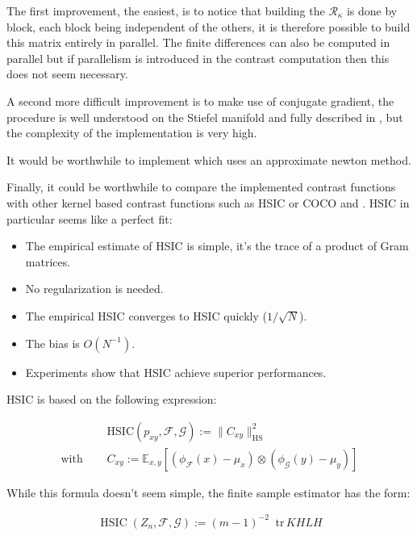 \documentclass[a4paper,BCOR=5mm,oneside,openany]{scrreprt}
\newcommand*\tr{\mathop{}\!\mathrm{tr}}
\begin{document}
The first improvement, the easiest, is to notice that building the $\mathcal{R}_\kappa$ is done by block, each block being independent of the others, it is therefore possible to build this matrix entirely in parallel. The finite differences can also be computed in parallel but if parallelism is introduced in the contrast computation then this does not seem necessary.

A second more difficult improvement is to make use of conjugate gradient, the procedure is well understood on the Stiefel manifold and fully described in \cite{Edelman1998}, but the complexity of the implementation is very high.

It would be worthwhile to implement \cite{Shen2009} which uses an approximate newton method.

Finally, it could be worthwhile to compare the implemented contrast functions with other kernel based contrast functions such as HSIC \cite{Shen2007} or COCO \cite{Gretton2005} and \cite{Gretton2005a}. HSIC in particular seems like a perfect fit:

\begin{itemize}
	\item The empirical estimate of HSIC is simple, it's the trace of a product of Gram matrices.
	\item No regularization is needed.
	\item The empirical HSIC converges to HSIC quickly ($1/\sqrt N$).
	\item The bias is $O(N^{-1})$.
	\item Experiments show that HSIC achieve superior performances.
\end{itemize}

HSIC is based on the following expression:

\begin{align*}
	& \textrm{HSIC}(p_{xy}, \mathcal{F}, \mathcal{G}) := \lVert C_{xy} \rVert^2_{\textrm{HS}} \\
	\text{with } \quad & C_{xy} := \mathbb{E}_{x,y} \left[ (\phi_\mathcal{F}(x) - \mu_x) \otimes (\phi_\mathcal{G}(y) -  \mu_y) \right]
\end{align*}

While this formula doesn't seem simple, the finite sample estimator has the form:

\begin{align*}
	\operatorname{HSIC}(Z_n,  \mathcal{F}, \mathcal{G}) := (m - 1)^{−2} \tr \, K H L H
\end{align*}
\end{document}
